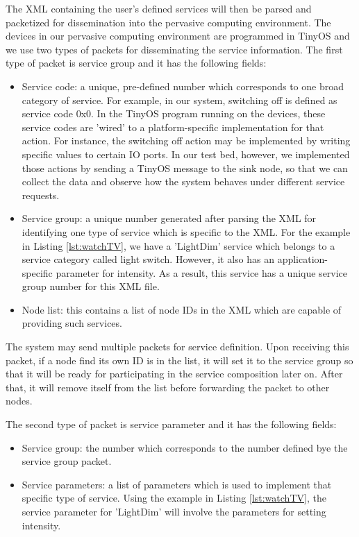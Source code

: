 The XML containing the user's defined services will then be parsed and packetized for dissemination into the pervasive computing environment. The devices in our pervasive computing environment are programmed in TinyOS and we use two types of packets for disseminating the service information. The first type of packet is service group and it has the following fields:
\begin{itemize}
\item Service code: a unique, pre-defined number which corresponds to one broad category of service. For example, in our system, switching off is defined as service code 0x0. In the TinyOS program running on the devices, these service codes are 'wired' to a platform-specific implementation for that action. For instance, the switching off action may be implemented by writing specific values to certain IO ports. In our test bed, however, we implemented those actions by sending a TinyOS message to the sink node, so that we can collect the data and observe how the system behaves under different service requests.
\item Service group: a unique number generated after parsing the XML for identifying one type of service which is specific to the XML. For the example in Listing \ref{lst:watchTV}, we have a 'LightDim' service which belongs to a service category called light switch. However, it also has an application-specific parameter for intensity. As a result, this service has a unique service group number for this XML file.
\item Node list: this contains a list of node IDs in the XML which are capable of providing such services.
\end{itemize}

The system may send multiple packets for service definition. Upon receiving this packet, if a node find its own ID is in the list, it will set it to the service group so that it will be ready for participating in the service composition later on. After that, it will remove itself from the list before forwarding the packet to other nodes.

The second type of packet is service parameter and it has the following fields:
\begin{itemize}
\item Service group: the number which corresponds to the number defined bye the service group packet.
\item Service parameters: a list of parameters which is used to implement that specific type of service. Using the example in Listing \ref{lst:watchTV}, the service parameter for 'LightDim' will involve the parameters for setting intensity. 
\end{itemize}

